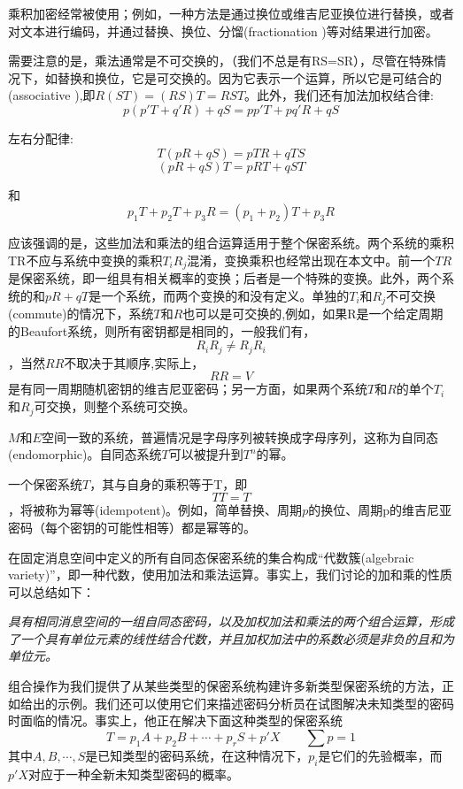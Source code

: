 \documentclass[]{article}
\begin{document}
乘积加密经常被使用；例如，一种方法是通过换位或维吉尼亚换位进行替换，或者对文本进行编码，并通过替换、换位、分馏(fractionation )等对结果进行加密。

需要注意的是，乘法通常是不可交换的，（我们不总是有RS=SR），尽管在特殊情况下，如替换和换位，它是可交换的。因为它表示一个运算，所以它是可结合的(associative ),即$R(ST)=(RS)T=RST$。此外，我们还有加法加权结合律:
\[p(p'T+q'R)+qS=pp'T+pq'R+qS\]

左右分配律:
\[T(pR+qS)=pTR+qTS\]
\[(pR+qS)T = pRT + qST\]

和
\[p_1T+p_2T+p_3R=(p_1+p_2)T+p_3R\]

应该强调的是，这些加法和乘法的组合运算适用于整个保密系统。两个系统的乘积TR不应与系统中变换的乘积$T_iR_j$混淆，变换乘积也经常出现在本文中。前一个$TR$是保密系统，即一组具有相关概率的变换；后者是一个特殊的变换。此外，两个系统的和$pR+qT$是一个系统，而两个变换的和没有定义。单独的$T_i$和$R_j$不可交换(commute)的情况下，系统$T$和$R$也可以是可交换的,例如，如果R是一个给定周期的Beaufort系统，则所有密钥都是相同的，一般我们有，
\[R_iR_j\neq R_jR_i\]
，当然$RR$不取决于其顺序,实际上，
\[RR=V\]
是有同一周期随机密钥的维吉尼亚密码；另一方面，如果两个系统$T$和$R$的单个$T_i$和$R_j$可交换，则整个系统可交换。

$M$和$E$空间一致的系统，普遍情况是字母序列被转换成字母序列，这称为自同态(endomorphic)。自同态系统$T$可以被提升到$T^n$的幂。

一个保密系统$T$，其与自身的乘积等于T，即
\[TT=T\]
，将被称为幂等(idempotent)。例如，简单替换、周期$p$的换位、周期p的维吉尼亚密码（每个密钥的可能性相等）都是幂等的。

在固定消息空间中定义的所有自同态保密系统的集合构成“代数簇(algebraic variety)”，即一种代数，使用加法和乘法运算。事实上，我们讨论的加和乘的性质可以总结如下：\par

\textsl{具有相同消息空间的一组自同态密码，以及加权加法和乘法的两个组合运算，形成了一个具有单位元素的线性结合代数，并且加权加法中的系数必须是非负的且和为单位元。}

组合操作为我们提供了从某些类型的保密系统构建许多新类型保密系统的方法，正如给出的示例。我们还可以使用它们来描述密码分析员在试图解决未知类型的密码时面临的情况。事实上，他正在解决下面这种类型的保密系统
\[T=p_1A+p_2B+\cdots+p_rS+p'X \qquad \sum p=1\]
其中$A,B,\cdots,S$是已知类型的密码系统，在这种情况下，$p_i$是它们的先验概率，而$p'X$对应于一种全新未知类型密码的概率。

\newpage
%   
%
\end{document}
